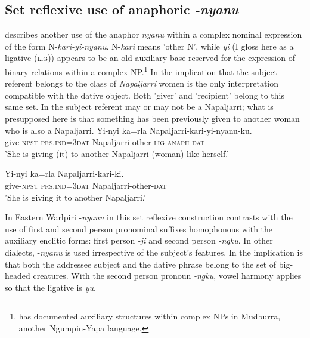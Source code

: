 \documentclass[output=paper]{../langscibook}
\begin{document}
\z

\subsection{Set reflexive use of anaphoric \textit{{}-nyanu}}\label{sec:laughren:4.2}

\citet[\S 3.4.3]{Simpson1991} describes another use of the anaphor \textit{nyanu} within a complex nominal expression of the form N-\textit{kari-yi-nyanu}. N-\textit{kari} means 'other N', while \textit{yi} (I gloss here as a ligative (\textsc{lig})) appears to be an old auxiliary base reserved for the expression of binary relations within a complex NP.\footnote{\textsuperscript{} \citet{McConvell1996} has documented auxiliary structures within complex NPs in Mudburra, another Ngumpin-Yapa language.} In  the implication that the subject referent belongs to the class of \textit{Napaljarri} women is the only interpretation compatible with the dative object. Both 'giver' and 'recipient' belong to this same set. In  the subject referent may or may not be a Napaljarri; what is presupposed here is that something has been previously given to another woman who is also a Napaljarri.
\ea%
    \label{ex:laughren:34}
\ea
\label{ex:laughren:34a}
\gll Yi-nyi	ka=rla	Napaljarri-kari-yi-nyanu-ku.\\
    give-\textsc{npst} \textsc{prs.ind=3dat} Napaljarri-other-\textsc{lig-anaph-dat}\\
\glt 'She is giving (it) to another Napaljarri (woman) like herself.'

\ex
\label{ex:laughren:34b}
\gll Yi-nyi	ka=rla	Napaljarri-kari-ki.\\
    give-\textsc{npst} \textsc{prs.ind=3dat} Napaljarri-other-\textsc{dat}\\
\glt 'She is giving it to another Napaljarri.'
\z
\z




In Eastern Warlpiri -\textit{nyanu} in this set reflexive construction contrasts with the use of first and second person pronominal suffixes homophonous with the auxiliary enclitic forms: first person \textit{\nobreakdash-ji} and second person \textit{\nobreakdash-ngku}. In other dialects, -\textit{nyanu} is used irrespective of the subject's features. In  the implication is that both the addressee subject and the dative phrase belong to the set of big-headed creatures. With the second person pronoun \textit{-ngku}, vowel harmony applies so that the ligative is \textit{yu}.
\end{document}
